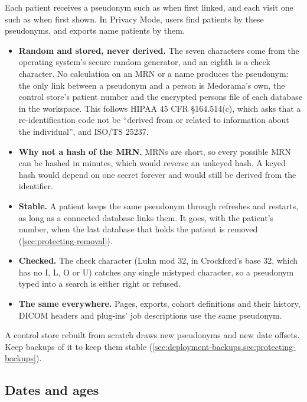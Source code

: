Each patient receives a pseudonym such as  when first linked, and each visit
one such as  when first shown. In Privacy Mode, users find patients by these pseudonyms, and
exports name patients by them.
\begin{itemize}
\item \textbf{Random and stored, never derived.} The seven characters come from the operating
  system's secure random generator, and an eighth is a check character. No calculation on an MRN
  or a name produces the pseudonym: the only link between a pseudonym and a person is
  Medorama's own, the control store's patient number and the encrypted persons file of each
  database in the workspace. This follows HIPAA 45 CFR \S164.514(c), which asks that a re-identification code not
  be ``derived from or related to information about the individual'', and ISO/TS 25237.
\item \textbf{Why not a hash of the MRN.} MRNs are short, so every possible MRN can be hashed in
  minutes, which would reverse an unkeyed hash. A keyed hash would depend on one secret forever
  and would still be derived from the identifier.
\item \textbf{Stable.} A patient keeps the same pseudonym through refreshes and restarts, as long
  as a connected database links them. It goes, with the patient's number, when the last database
  that holds the patient is removed (\cref{sec:protecting-removal}).
\item \textbf{Checked.} The check character (Luhn mod 32, in Crockford's base 32, which has no I,
  L, O or U) catches any single mistyped character, so a pseudonym typed into a search is either
  right or refused.
\item \textbf{The same everywhere.} Pages, exports, cohort definitions and their history, DICOM
  headers and plug-ins' job descriptions use the same pseudonym.
\end{itemize}
A control store rebuilt from scratch draws new pseudonyms and new date offsets. Keep backups of
it to keep them stable (\cref{sec:deployment-backups,sec:protecting-backups}).

\subsection{Dates and ages}
\label{sec:protecting-dates}

